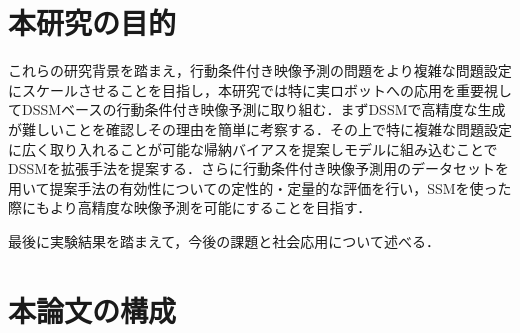 \section{本研究の目的}

これらの研究背景を踏まえ，行動条件付き映像予測の問題をより複雑な問題設定にスケールさせることを目指し，本研究では特に実ロボットへの応用を重要視してDSSMベースの行動条件付き映像予測に取り組む．まずDSSMで高精度な生成が難しいことを確認しその理由を簡単に考察する．その上で特に複雑な問題設定に広く取り入れることが可能な帰納バイアスを提案しモデルに組み込むことでDSSMを拡張手法を提案する．さらに行動条件付き映像予測用のデータセットを用いて提案手法の有効性についての定性的・定量的な評価を行い，SSMを使った際にもより高精度な映像予測を可能にすることを目指す．

最後に実験結果を踏まえて，今後の課題と社会応用について述べる．

\section{本論文の構成}







